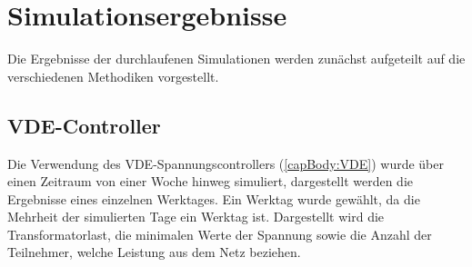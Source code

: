 \section{Simulationsergebnisse}
Die Ergebnisse der durchlaufenen Simulationen werden zunächst aufgeteilt auf die verschiedenen Methodiken vorgestellt.  
\subsection{VDE-Controller}
\label{chap_VDE}
Die Verwendung des VDE-Spannungscontrollers (\ref{capBody:VDE}) wurde über einen Zeitraum von einer Woche hinweg simuliert, dargestellt werden die Ergebnisse eines einzelnen Werktages. Ein Werktag wurde gewählt, da die Mehrheit der simulierten Tage ein Werktag ist. Dargestellt wird die Transformatorlast, die minimalen Werte der Spannung sowie die Anzahl der Teilnehmer, welche Leistung aus dem Netz beziehen. 
